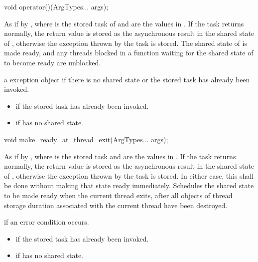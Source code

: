 %
\begin{itemdecl}
void operator()(ArgTypes... args);
\end{itemdecl}

\begin{itemdescr}
\pnum
\effects As if by ,
where  is the
stored task of  and
 are the values in . If the task returns normally,
the return value is stored as the asynchronous result in the shared state of
, otherwise the exception thrown by the task is stored. The
shared state of  is made ready, and any threads blocked in a
function waiting for
the shared state of  to become ready are unblocked.

\pnum
\throws a  exception object if there is no shared
state or the stored task has already been invoked.

\pnum
\errors
\begin{itemize}
\item {} if
the stored task has already been invoked.
\item {} if  has no shared state.
\end{itemize}
\end{itemdescr}

%
\begin{itemdecl}
void make_ready_at_thread_exit(ArgTypes... args);
\end{itemdecl}

\begin{itemdescr}
\pnum
\effects As if by ,
where  is the stored task and
 are the values in . If the task returns normally,
the return value is stored as the asynchronous result in the shared state of
, otherwise the exception thrown by the task is stored. In either
case, this shall be done without making that state ready immediately. Schedules
the shared state to be made ready when the current thread exits,
after all objects of thread storage duration associated with the current thread
have been destroyed.

\pnum
\throws {} if an error condition occurs.

\pnum
\errors
\begin{itemize}
\item {} if the
stored task has already been invoked.
\item {} if  has no shared state.
\end{itemize}
\end{itemdescr}

